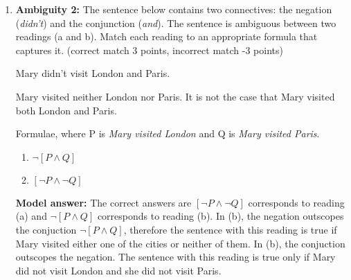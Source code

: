 \documentclass[a4,11pt]{article}
\newcommand{\6}{\mbox{$[\hspace*{-.6mm}[$}}
\newcommand{\9}{\mbox{$]\hspace*{-.6mm}]$}}
\begin{document}
\begin{enumerate}[leftmargin = 12pt]
A. Kim sings and Sandy laughs or Alex cries.

B. $k \wedge [s \vee a]$

{\bf Model answer:} A is ambiguous because we do not know whether the right disjunct of ``and'' is ``Sandy laughs'' or ``Sandy laughs or Alex cries''. B is not ambiguous because the brackets make clear that right disjunct is the complex expression $s \vee a$, i.e., the translation of the English sentence ``Sandy laughs or Alex cries''.

\item  {\bf Ambiguity 2:} The sentence below contains two connectives: the negation (\textit{didn't}) and the conjunction (\textit{and}). The sentence is ambiguous between two readings (a and b). Match each reading to an appropriate formula that captures it. (correct match 3 points, incorrect match -3 points)

\begin{exe}
\ex Mary didn't visit London and Paris.
\begin{xlist}
\ex Mary visited neither London nor Paris.
\ex It is not the case that Mary visited both London and Paris.
\end{xlist}
\end{exe}

Formulae, where P is \textit{Mary visited London} and Q is \textit{Mary visited Paris}. 
\begin{enumerate}[noitemsep]
\item $\neg [P \land Q ]$
\item $[\neg P \land \neg Q]$
\end{enumerate}

{ \bf Model answer:}  The correct answers are $[\neg P \land \neg Q]$ corresponds to reading (a) and $\neg [P \land Q ]$ corresponds to reading (b). In (b), the negation outscopes the conjuction $\neg [P \land Q ]$, therefore the sentence with this reading is true if Mary visited either one of the cities or neither of them. In (b), the conjuction outscopes the negation. The sentence with this reading is true only if Mary did not visit London and she did not visit Paris.


\end{enumerate}
\end{document}
